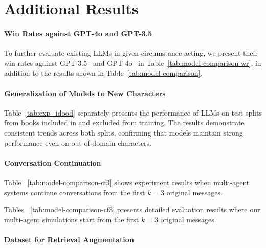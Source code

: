 










\section{Additional Results}
\label{sec:additional_results}

\paragraph{Win Rates against GPT-4o and GPT-3.5}


To further evaluate existing LLMs in given-circumstance acting, we present their win rates against GPT-3.5~\citep{openai2022chatgpt} and GPT-4o~\citep{OpenAI2023GPT4TR} in Table~\ref{tab:model-comparison-wr}, in addition to the results shown in Table~\ref{tab:model-comparison}.



\paragraph{Generalization of \method Models to New Characters}

Table~\ref{tab:exp_idood} separately presents the performance of LLMs on test splits from books included in and excluded from \method training. 
The results demonstrate consistent trends across both splits, confirming that \method models maintain strong performance even on out-of-domain characters.



\paragraph{Conversation Continuation}

Table ~\ref{tab:model-comparison-cf3} %
shows experiment results when multi-agent systems continue conversations from the first $k=3$ original messages.  

Tables ~\ref{tab:model-comparison-cf3} presents detailed evaluation results where our multi-agent simulations start from the first $k=3$ original messages.




\paragraph{\method Dataset for Retrieval Augmentation}

